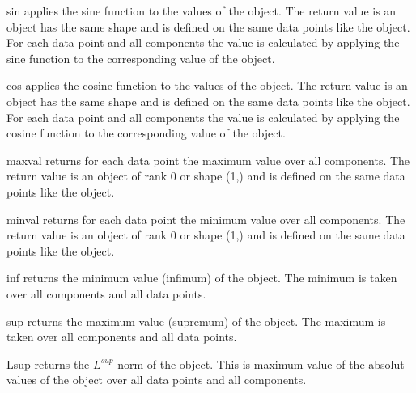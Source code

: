 \begin{methoddesc}[Data]{sin}{}
applies the sine function to the values of the object. The return
value is an object has the same shape and is defined on the same data
points like the object.  For each data point and all components the
value is calculated by applying the sine function to the
corresponding value of the object.  
\end{methoddesc}

\begin{methoddesc}[Data]{cos}{}
applies the cosine function to the values of the object. The return
value is an object has the same shape and is defined on the same data
points like the object.  For each data point and all components the
value is calculated by applying the cosine function to the
corresponding value of the object.  
\end{methoddesc}

\begin{methoddesc}[Data]{maxval}{}
returns for each data point the maximum value over all components. The
return value is an object of rank 0 or shape (1,) and is defined on
the same data points like the object.  
\end{methoddesc}

\begin{methoddesc}[Data]{minval}{}
returns for each data point the minimum value over all components. The
return value is an object of rank 0 or shape (1,) and is defined on
the same data points like the object.  
\end{methoddesc}

\begin{methoddesc}[Data]{inf}{}
returns the minimum value (infimum) of the object. The minimum is
taken over all components and all data points.  
\end{methoddesc}

\begin{methoddesc}[Data]{sup}{}
returns the maximum value (supremum) of the object. The maximum is
taken over all components and all data points.  
\end{methoddesc}

\begin{methoddesc}[Data]{Lsup}{}
returns the $L^{sup}$-norm of the object. This is maximum value of the
absolut values of the object over all data points and all components.
\end{methoddesc}

